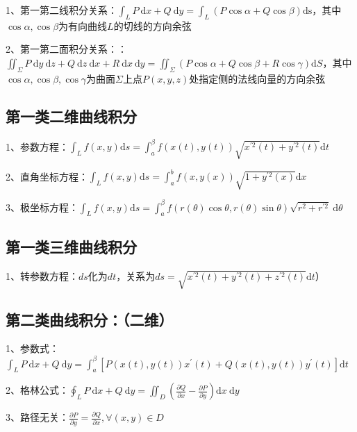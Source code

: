 1、第一第二线积分关系：$\int_{L} P \mathrm{~d} x+Q \mathrm{~d} y=\int_{L}(P \cos \alpha+Q \cos \beta) \mathrm{ds}$，其中$\cos \alpha, \cos \beta$为有向曲线$L$的切线的方向余弦

2、第一第二面积分关系：：$\iint_{\Sigma} P \mathrm{~d} y \mathrm{~d} z+Q \mathrm{~d} z \mathrm{~d} x+R \mathrm{~d} x \mathrm{~d} y=\iint_{\Sigma}(P \cos \alpha+Q \cos \beta+R \cos \gamma) \mathrm{d} S$，其中$\cos \alpha, \cos \beta, \cos \gamma$为曲面$\Sigma$上点$P(x, y, z)$处指定侧的法线向量的方向余弦



\subsection{第一类二维曲线积分}

1、参数方程：$\int_{L} f(x, y) \mathrm{d} s=\int_{a}^{\beta} f(x(t), y(t)) \sqrt{x^{\prime 2}(t)+y^{\prime 2}(t)} \mathrm{d} t$

2、直角坐标方程：$\int_{L} f(x, y) \mathrm{d} s=\int_{a}^{b} f(x, y(x)) \sqrt{1+y^{\prime 2}(x)} \mathrm{d} x$

3、极坐标方程：$\int_{L} f(x, y) \mathrm{d} s=\int_{a}^{\beta} f(r(\theta) \cos \theta, r(\theta) \sin \theta) \sqrt{r^{2}+r^{\prime 2}} \mathrm{~d} \theta$



\subsection{第一类三维曲线积分}

1、转参数方程：$ds$化为$dt$，关系为$ds = \sqrt{x^{\prime 2}(t)+y^{\prime 2}(t)+z^{\prime 2}(t)} \mathrm{d} t$）



\subsection{第二类曲线积分：（二维）}

1、参数式：$\int_{L} P \mathrm{~d} x+Q \mathrm{~d} y=\int_{a}^{\beta}\left[P(x(t), y(t)) x^{\prime}(t)+Q(x(t), y(t)) y^{\prime}(t)\right] \mathrm{d} t$

2、格林公式：$\oint_{L} P \mathrm{~d} x+Q \mathrm{~d} y=\iint_{D}\left(\frac{\partial Q}{\partial x}-\frac{\partial P}{\partial y}\right) \mathrm{d} x \mathrm{~d} y$

3、路径无关：$\frac{\partial P}{\partial y}=\frac{\partial Q}{\partial x}, \forall(x, y) \in D$



